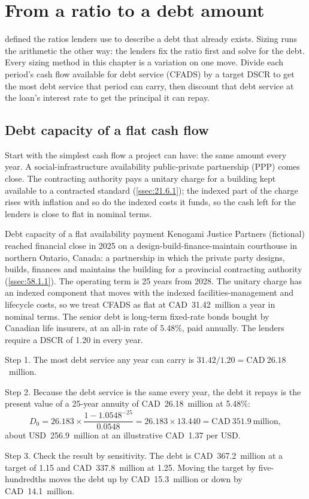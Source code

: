 \section{From a ratio to a debt amount}\label{sec:36.1}

 defined the ratios lenders use to describe a debt that already exists. Sizing runs the arithmetic the other way: the lenders fix the ratio first and solve for the debt. Every sizing method in this chapter is a variation on one move. Divide each period's cash flow available for debt service (CFADS) by a target DSCR to get the most debt service that period can carry, then discount that debt service at the loan's interest rate to get the principal it can repay.

\subsection{Debt capacity of a flat cash flow}\label{ssec:36.1.1}

Start with the simplest cash flow a project can have: the same amount every year. A social-infrastructure availability public-private partnership (PPP) comes close. The contracting authority pays a unitary charge for a building kept available to a contracted standard (\cref{ssec:21.6.1}); the indexed part of the charge rises with inflation and so do the indexed costs it funds, so the cash left for the lenders is close to flat in nominal terms.

\begin{example}{Debt capacity of a flat availability payment \illustrative}\label{ex:36.1}
Kenogami Justice Partners (fictional) reached financial close in 2025 on a design-build-finance-maintain courthouse in northern Ontario, Canada: a partnership in which the private party designs, builds, finances and maintains the building for a provincial contracting authority (\cref{ssec:58.1.1}). The operating term is 25 years from 2028. The unitary charge has an indexed component that moves with the indexed facilities-management and lifecycle costs, so we treat CFADS as flat at CAD~31.42~million a year in nominal terms. The senior debt is long-term fixed-rate bonds bought by Canadian life insurers, at an all-in rate of 5.48\%, paid annually. The lenders require a DSCR of 1.20\x{} in every year.

Step 1. The most debt service any year can carry is $31.42/1.20 = \mathrm{CAD}~26.18$~million.

Step 2. Because the debt service is the same every year, the debt it repays is the present value of a 25-year annuity of CAD~26.18~million at 5.48\%:
\begin{equation*}
D_0 = 26.183 \times \frac{1 - 1.0548^{-25}}{0.0548} = 26.183 \times 13.440 = \mathrm{CAD}~351.9~\text{million},
\end{equation*}
about USD~256.9~million at an illustrative CAD~1.37 per USD.

Step 3. Check the result by sensitivity. The debt is CAD~367.2~million at a target of 1.15\x{} and CAD~337.8~million at 1.25\x. Moving the target by five-hundredths moves the debt up by CAD~15.3~million or down by CAD~14.1~million.
\end{example}

